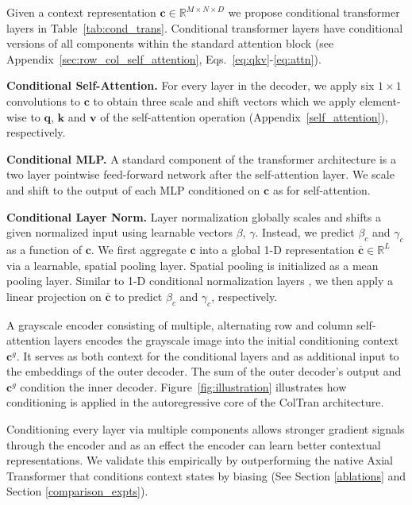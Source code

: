 \documentclass{article} \usepackage{iclr2021_conference,times}
\newcommand{\bb}[1]{\mathbf{#1}}
\newcommand{\bv}{\bb{v}}
\newcommand{\bk}{\bb{k}}
\newcommand{\bq}{\bb{q}}
\newcommand{\bc}{\bb{c}}
\begin{document}
Given a context representation $\bc \in \mathbb{R}^{M {\times} N {\times} D}$ we propose conditional transformer layers in Table~\ref{tab:cond_trans}. Conditional transformer layers have conditional versions of all components within the standard attention block (see Appendix~\ref{sec:row_col_self_attention}, Eqs.~\ref{eq:qkv}-\ref{eq:attn}).

\textbf{Conditional Self-Attention.} For every layer in the decoder, we apply six $1 {\times} 1$ convolutions to $\bc$ to obtain three scale and shift vectors which we apply element-wise to $\bq$, $\bk$ and $\bv$ of the self-attention operation (Appendix~\ref{self_attention}), respectively.

\textbf{Conditional MLP.}
A standard component of the transformer architecture is a two layer pointwise feed-forward network after the self-attention layer. We scale and shift to the output of each MLP conditioned on $\bc$ as for self-attention.

\textbf{Conditional Layer Norm.}
Layer normalization \citep{ba2016layer} globally scales and shifts a given normalized input using learnable vectors $\beta$, $\gamma$. Instead, we predict $\beta_c$ and $\gamma_c$ as a function of $\bc$. We first aggregate $\bc$ into a global 1-D representation $\overline{\bc} \in \mathbb{R}^{L}$ via a learnable, spatial pooling layer. Spatial pooling is initialized as a mean pooling layer. Similar to 1-D conditional normalization layers \citep{perez2017film, de2017modulating, dumoulin2016learned, huang2017arbitrary}, we then apply a linear projection on $\overline{\bc}$ to predict $\beta_c$ and $\gamma_c$, respectively.

A grayscale encoder consisting of multiple, alternating row and column self-attention layers encodes the grayscale image into the initial conditioning context $\bc^{g}$. It serves as both context for the conditional layers and as additional input to the embeddings of the outer decoder. The sum of the outer decoder's output and $\bc^g$ condition the inner decoder. Figure~\ref{fig:illustration} illustrates how conditioning is applied in the autoregressive core of the ColTran architecture.

Conditioning every layer via multiple components allows stronger gradient signals through the encoder and as an effect the encoder can learn better contextual representations. We validate this empirically by outperforming the native Axial Transformer that conditions context states by biasing (See Section \ref{ablations} and Section \ref{comparison_expts}).
\end{document}
